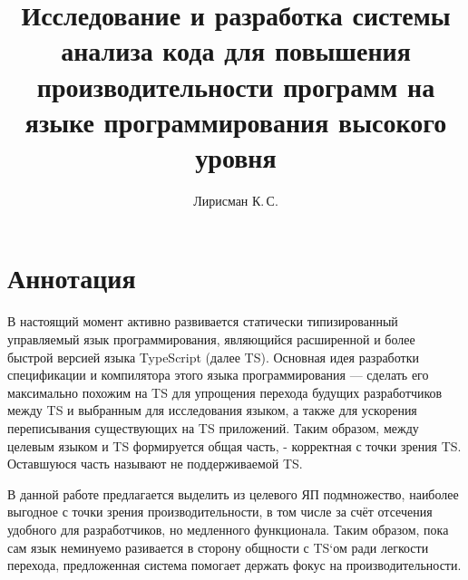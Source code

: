 \documentclass{mipt-thesis-bs}
\title{Исследование и разработка системы анализа кода для повышения производительности программ на языке программирования высокого уровня}
\author{Лирисман К.\,С.}
\begin{document}
\frontmatter
\titlecontents

\chapter{Аннотация}

В настоящий момент активно развивается статически типизированный управляемый язык
программирования, являющийся расширенной и более быстрой версией языка TypeScript (далее TS).
Основная идея разработки спецификации и компилятора этого языка программирования — сделать его максимально 
похожим на TS для упрощения перехода будущих разработчиков между TS и
выбранным для исследования языком, а также для ускорения переписывания существующих на TS приложений.
Таким образом, между целевым языком и TS формируется общая часть, - корректная с точки зрения TS. 
Оставшуюся часть называют не поддерживаемой TS.

В данной работе предлагается выделить из целевого ЯП подмножество, наиболее выгодное с точки зрения производительности, 
в том числе за счёт отсечения удобного для разработчиков, но медленного функционала. Таким образом, пока сам язык неминуемо 
разивается в сторону общности с TS`ом ради легкости перехода, предложенная система помогает держать фокус 
на производительности.
\end{document}

